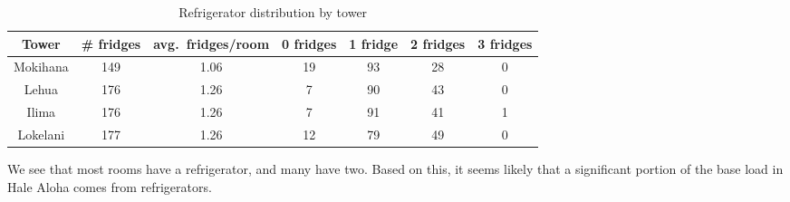 \begin{table}[htbp]
	\centering
		\begin{tabular}{| c || c | c | c | c | c | c |}
			\hline
			Tower & \# fridges & avg.\ fridges/room & 0 fridges & 1 fridge & 2 fridges & 3 fridges \tabularnewline \hline \hline
			
			Mokihana & 149 & 1.06 & 19 & 93 & 28 & 0  \tabularnewline \hline
			
			Lehua & 176 & 1.26 & 7 & 90 & 43 & 0 \tabularnewline \hline
			
			Ilima & 176 & 1.26 & 7 & 91 & 41 & 1 \tabularnewline \hline

			Lokelani & 177 & 1.26 & 12 & 79 & 49 & 0 \tabularnewline \hline

		\end{tabular}
	\caption{Refrigerator distribution by tower}
\label{tab:fridge-distribution}
\end{table}

We see that most rooms have a refrigerator, and many have two. Based on this, it seems likely that a significant portion of the base load in Hale Aloha comes from refrigerators.
